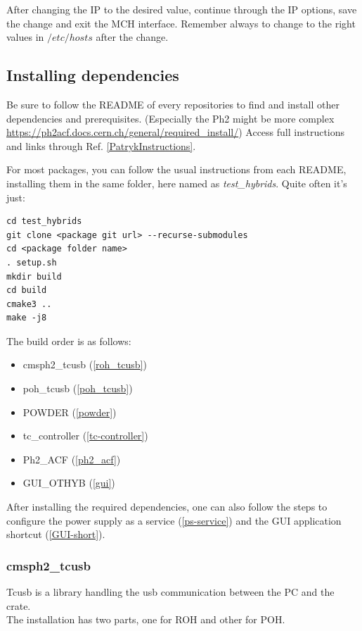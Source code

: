 \documentclass[10pt,a4paper]{article}
\begin{document}
After changing the IP to the desired value, continue through the IP options, save the change and exit the MCH interface. Remember always to change to the right values in $/etc/hosts $ after the change.


\subsection{Installing dependencies}

Be sure to follow the README of every repositories to find and install other dependencies and prerequisites.
(Especially the Ph2 might be more complex \url{https://ph2acf.docs.cern.ch/general/required_install/})
Access full instructions and links through Ref. \ref{PatrykInstructions}. 

For most packages, you can follow the usual instructions from each README, installing them in the same folder, here named as \emph{test\_hybrids}.
Quite often it’s just:

\begin{framed}
\begin{verbatim}
cd test_hybrids
git clone <package git url> --recurse-submodules
cd <package folder name>
. setup.sh
mkdir build
cd build
cmake3 ..
make -j8
\end{verbatim}
\end{framed}

The build order is as follows:
\begin{itemize}
    \item cmsph2\_tcusb (\ref{roh_tcusb})
    \item poh\_tcusb (\ref{poh_tcusb})
    \item POWDER (\ref{powder})
    \item tc\_controller (\ref{tc-controller})
    \item Ph2\_ACF (\ref{ph2_acf})
    \item GUI\_OTHYB (\ref{gui})
\end{itemize}

After installing the required dependencies, one can also follow the steps to configure the power supply as a service (\ref{ps-service}) and the GUI application shortcut (\ref{GUI-short}).

\subsubsection{cmsph2\_tcusb}

Tcusb is a library handling the usb communication between the PC and the crate.  \\
The installation has two parts, one for ROH and other for POH.
\end{document}
